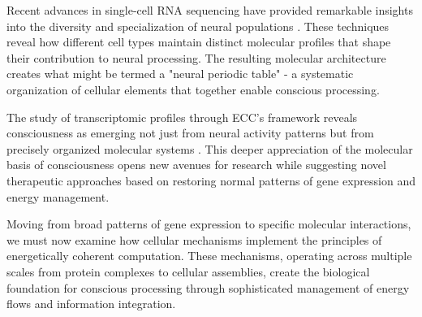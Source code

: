 Recent advances in single-cell RNA sequencing have provided remarkable insights into the diversity and specialization of neural populations \cite{Lake2016}. These techniques reveal how different cell types maintain distinct molecular profiles that shape their contribution to neural processing. The resulting molecular architecture creates what might be termed a "neural periodic table" - a systematic organization of cellular elements that together enable conscious processing.

The study of transcriptomic profiles through ECC's framework reveals consciousness as emerging not just from neural activity patterns but from precisely organized molecular systems \cite{Zeng2017}. This deeper appreciation of the molecular basis of consciousness opens new avenues for research while suggesting novel therapeutic approaches based on restoring normal patterns of gene expression and energy management.

Moving from broad patterns of gene expression to specific molecular interactions, we must now examine how cellular mechanisms implement the principles of energetically coherent computation. These mechanisms, operating across multiple scales from protein complexes to cellular assemblies, create the biological foundation for conscious processing through sophisticated management of energy flows and information integration.